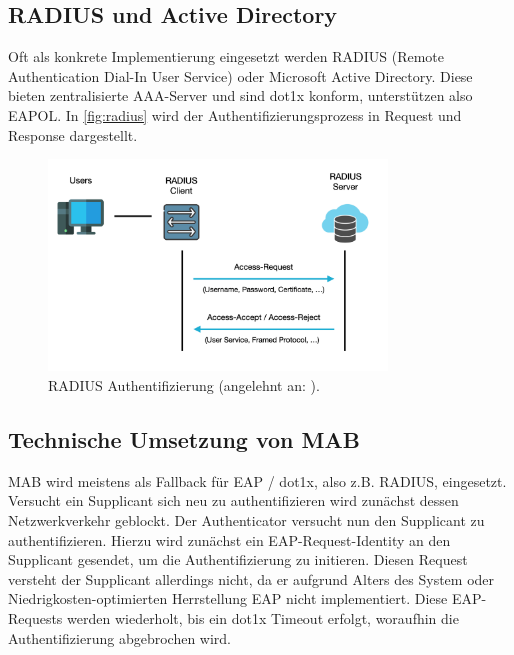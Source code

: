 \documentclass[conference]{IEEEtran}
\begin{document}
\vspace{.5em}
\subsection{RADIUS und Active Directory}
Oft als konkrete Implementierung eingesetzt werden RADIUS (Remote Authentication Dial-In User Service) oder Microsoft Active Directory. Diese bieten zentralisierte AAA-Server und sind dot1x konform, unterstützen also EAPOL. In \autoref{fig:radius} wird der Authentifizierungsprozess in Request und Response dargestellt.

\begin{figure}[hbt]
	\centering
	\includegraphics[width=9cm]{figures/radius}
	\caption{RADIUS Authentifizierung (angelehnt an: \cite{radius}).}
	\label{fig:radius}
\end{figure}

\vspace{.5em}
\subsection{Technische Umsetzung von MAB}
MAB wird meistens als Fallback für EAP / dot1x, also z.B. RADIUS, eingesetzt. Versucht ein Supplicant sich neu zu authentifizieren wird zunächst dessen Netzwerkverkehr geblockt. Der Authenticator versucht nun den Supplicant zu authentifizieren. Hierzu wird zunächst ein EAP-Request-Identity an den Supplicant gesendet, um die Authentifizierung zu initieren. Diesen Request versteht der Supplicant allerdings nicht, da er aufgrund Alters des System oder Niedrigkosten-optimierten Herrstellung EAP nicht implementiert. Diese EAP-Requests werden wiederholt, bis ein dot1x Timeout erfolgt, woraufhin die Authentifizierung abgebrochen wird. \cite{eap}\\
\end{document}
